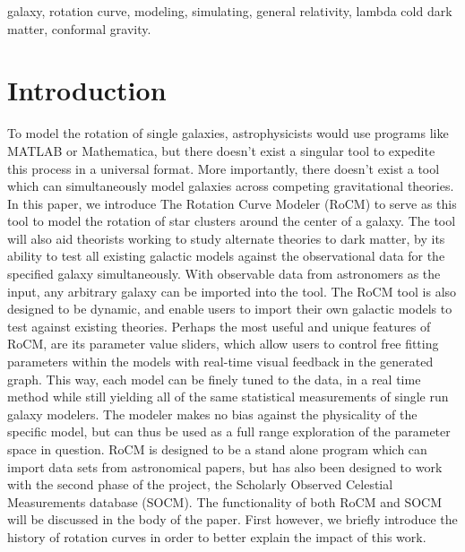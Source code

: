 \documentclass[conference]{IEEEtran-modified}
\begin{document}
	
	\begin{IEEEkeywords}
	\begin{center}
	galaxy, rotation curve, modeling, simulating, general relativity, lambda cold dark matter, conformal gravity.
	\end{center}	
	\end{IEEEkeywords}
	
	
	\IEEEpeerreviewmaketitle
\thispagestyle{plain}
\pagestyle{plain}

\section{Introduction}
To model the rotation of single galaxies, astrophysicists would use programs like MATLAB or Mathematica, but there doesn't exist a singular tool to expedite this process in a universal format.   More importantly, there doesn't exist a tool which can simultaneously model galaxies across competing gravitational theories.  In this paper, we introduce The Rotation Curve Modeler (RoCM) to serve as this tool to model the rotation of star clusters around the center of a galaxy. The tool will also aid theorists working to study alternate theories to dark matter, by its ability to test all existing galactic models against the observational data for the specified galaxy simultaneously. With observable data from astronomers as the input, any arbitrary galaxy can be imported into the tool. The RoCM tool is also designed to be dynamic, and enable users to import their own galactic models to test against existing theories.  Perhaps the most useful and unique features of RoCM, are its parameter value sliders, which allow users to control free fitting parameters within the models with real-time visual feedback in the generated graph. This way, each model can be finely tuned to the data, in a real time method while still yielding all of the same statistical measurements of single run galaxy modelers. The modeler makes no bias against the physicality of the specific model, but can thus be used as a full range exploration of the parameter space in question.  RoCM is designed to be a stand alone program which can import data sets from astronomical papers, but has also been designed to work with the second phase of the project, the Scholarly Observed Celestial Measurements database (SOCM). The functionality of both RoCM and SOCM will be discussed in the body of the paper.  First however, we briefly introduce the history of rotation curves in order to better explain the impact of this work.
\end{document}
